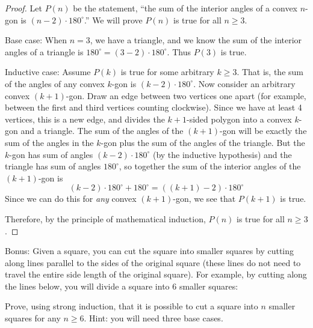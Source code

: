 \documentclass[10pt]{exam}
\begin{document}
\begin{questions}
\begin{solution}
\begin{proof}
Let $P(n)$ be the statement, ``the sum of the interior angles of a convex $n$-gon is $(n-2)\cdot 180^\circ$.''  We will prove $P(n)$ is true for all $n \ge 3$.

Base case: When $n=3$, we have a triangle, and we know the sum of the interior angles of a triangle is $180^\circ = (3-2)\cdot 180^\circ$.  Thus $P(3)$ is true.

Inductive case: Assume $P(k)$ is true for some arbitrary $k \ge 3$.  That is, the sum of the angles of any convex $k$-gon is $(k-2)\cdot 180^\circ$.  Now consider an arbitrary convex $(k+1)$-gon.  Draw an edge between two vertices one apart (for example, between the first and third vertices counting clockwise).  Since we have at least 4 vertices, this is a new edge, and divides the $k+1$-sided polygon into a convex $k$-gon and a triangle.  The sum of the angles of the $(k+1)$-gon will be exactly the sum of the angles in the $k$-gon plus the sum of the angles of the triangle.  But the $k$-gon has sum of angles $(k-2)\cdot 180^\circ$ (by the inductive hypothesis) and the triangle has sum of angles $180^\circ$, so together the sum of the interior angles of the $(k+1)$-gon is
\[(k-2)\cdot 180^\circ + 180^\circ = ((k+1)-2)\cdot 180^\circ\]
Since we can do this for \emph{any} convex $(k+1)$-gon, we see that $P(k+1)$ is true.

Therefore, by the principle of mathematical induction, $P(n)$ is true for all $n\ge 3$.

\end{proof}

\end{solution}



\bonusquestion[5] Bonus: Given a square, you can cut the square into smaller squares by cutting along lines parallel to the sides of the original square (these lines do not need to travel the entire side length of the original square).  For example, by cutting along the lines below, you will divide a square into 6 smaller squares:
\begin{center}
\end{center}
Prove, using strong induction, that it is possible to cut a square into $n$ smaller squares for any $n \ge 6$.  Hint: you will need three base cases.


\end{questions}
\end{document}
